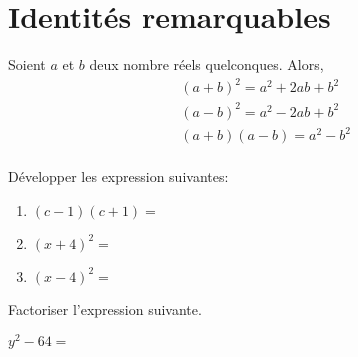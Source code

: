 \documentclass{article}
\begin{document}
\section{Identités remarquables}
\begin{proposition}
Soient $a$ et $b$ deux nombre réels quelconques. Alors,
\begin{equation*}
\begin{aligned}
&(a + b)^2 = a^2 + 2ab + b^2\\ 
&(a - b)^2 = a^2 - 2ab + b^2\\ 
&(a + b)(a - b) = a^2 - b^2\\ 
\end{aligned}
\end{equation*}
\end{proposition}
\begin{example}
Développer les expression suivantes:
\begin{enumerate}[label=\emph{\alph*)}]
\item $(c-1)(c+1)=$ \answersline
\item $(x+4)^2=$ \answersline
\item $(x-4)^2=$ \answersline
\end{enumerate}    
\end{example}
\vspace*{0.5cm}
\begin{example}
Factoriser l'expression suivante. 

$y^2 - 64 =$ \answersline
\end{example}
\end{document}
